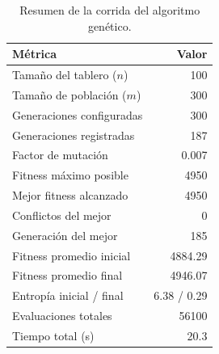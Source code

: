 \begin{table}[H]
\centering
\small
\caption{Resumen de la corrida del algoritmo genético.}
\label{tab:resumen_ag}
\begin{tabular}{lr}
\hline
\textbf{Métrica} & \textbf{Valor} \\
\hline
Tamaño del tablero ($n$) & 100 \\
Tamaño de población ($m$) & 300 \\
Generaciones configuradas & 300 \\
Generaciones registradas & 187 \\
Factor de mutación & 0.007 \\
Fitness máximo posible & 4950 \\
Mejor fitness alcanzado & 4950 \\
Conflictos del mejor & 0 \\
Generación del mejor & 185 \\
Fitness promedio inicial & 4884.29 \\
Fitness promedio final & 4946.07 \\
Entropía inicial / final & 6.38 / 0.29 \\
Evaluaciones totales & 56100 \\
Tiempo total (s) & 20.3 \\
\hline
\end{tabular}
\end{table}
